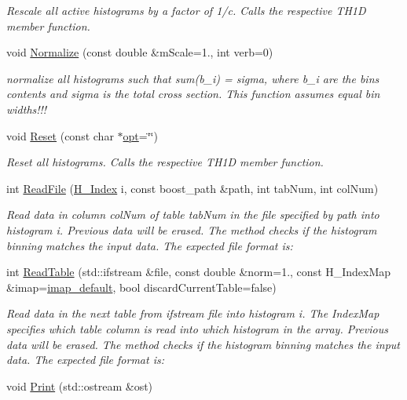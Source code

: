 \begin{DoxyCompactItemize}
\begin{DoxyCompactList}\small\item\em Rescale all active histograms by a factor of 1/c. Calls the respective T\+H1\+D member function. \end{DoxyCompactList}\item 
void \hyperlink{classHistArray_a2c7edebf7ddf7d5dcc2cbb30f46601e5}{Normalize} (const double \&m\+Scale=1., int verb=0)
\begin{DoxyCompactList}\small\item\em normalize all histograms such that sum(b\+\_\+i) = sigma, where b\+\_\+i are the bins contents and sigma is the total cross section. This function assumes equal bin widths!!! \end{DoxyCompactList}\item 
void \hyperlink{classHistArray_a75049ae9fb04661cdd2f3c3e67550568}{Reset} (const char $\ast$\hyperlink{structopt}{opt}=\char`\"{}\char`\"{})
\begin{DoxyCompactList}\small\item\em Reset all histograms. Calls the respective T\+H1\+D member function. \end{DoxyCompactList}\item 
int \hyperlink{classHistArray_a86df487949773c027114237875ba7c94}{Read\+File} (\hyperlink{HistArray_8h_abdf25c9f0ab78c4243f63cb2bacf26d9}{H\+\_\+\+Index} i, const boost\+\_\+path \&path, int tab\+Num, int col\+Num)
\begin{DoxyCompactList}\small\item\em Read data in column \textquotesingle{}col\+Num\textquotesingle{} of table \textquotesingle{}tab\+Num\textquotesingle{} in the file specified by \textquotesingle{}path\textquotesingle{} into histogram \textquotesingle{}i\textquotesingle{}. Previous data will be erased. The method checks if the histogram binning matches the input data. The expected file format is\+: \end{DoxyCompactList}\item 
int \hyperlink{classHistArray_ad41461653c6d0a87d8b36db233a71a0f}{Read\+Table} (std\+::ifstream \&file, const double \&norm=1., const H\+\_\+\+Index\+Map \&imap=\hyperlink{HistArray_8h_a8f6e68438441b2967eb8e97c8b4c2380}{imap\+\_\+default}, bool discard\+Current\+Table=false)
\begin{DoxyCompactList}\small\item\em Read data in the next table from ifstream \textquotesingle{}file\textquotesingle{} into histogram \textquotesingle{}i\textquotesingle{}. The Index\+Map specifies which table column is read into which histogram in the array. Previous data will be erased. The method checks if the histogram binning matches the input data. The expected file format is\+: \end{DoxyCompactList}\item 
\hypertarget{classHistArray_adb997e3f81ccdf02e7964dcbac1bff6e}{}void \hyperlink{classHistArray_adb997e3f81ccdf02e7964dcbac1bff6e}{Print} (std\+::ostream \&ost)\label{classHistArray_adb997e3f81ccdf02e7964dcbac1bff6e}


\end{DoxyCompactItemize}
